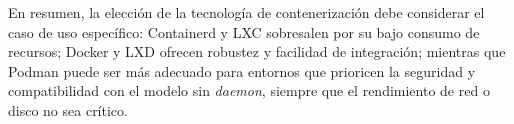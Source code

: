 \vspace{0.5em}

\noindent En resumen, la elección de la tecnología de contenerización debe considerar el caso de uso específico: Containerd y LXC sobresalen por su bajo consumo de recursos; Docker y LXD ofrecen robustez y facilidad de integración; mientras que Podman puede ser más adecuado para entornos que prioricen la seguridad y compatibilidad con el modelo sin \textit{daemon}, siempre que el rendimiento de red o disco no sea crítico.
